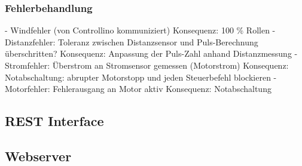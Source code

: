 \subsubsection{Fehlerbehandlung}
- Windfehler (von Controllino kommuniziert)
	Konsequenz: 100 \% Rollen
- Distanzfehler: Toleranz zwischen Distanzsensor und Puls-Berechnung überschritten?
	Konsequenz: Anpassung der Puls-Zahl anhand Distanzmessung
- Stromfehler: Überstrom an Stromsensor gemessen (Motorstrom)
	Konsequenz: Notabschaltung: abrupter Motorstopp und jeden Steuerbefehl blockieren
- Motorfehler: Fehlerausgang an Motor aktiv
	Konsequenz: Notabschaltung
\subsection{REST Interface}
\subsection{Webserver}





